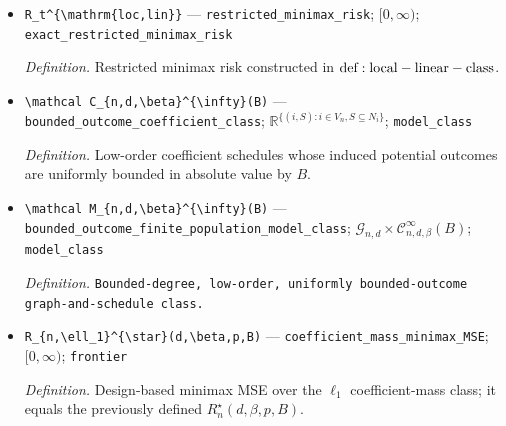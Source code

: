 \documentclass{article}
\begin{document}
\begin{itemize}
  \par\smallskip\noindent\emph{Definition.} Admissible coefficient schedules on the fixed graph \(G_t\).
  \item \texttt{R\_\allowbreak{}t\textasciicircum{}\{\textbackslash{}\allowbreak{}mathrm\{loc,\allowbreak{}lin\}\allowbreak{}\}\allowbreak{}} --- \texttt{restricted\_\allowbreak{}minimax\_\allowbreak{}risk}; \([0,\infty)\); \texttt{exact\_\allowbreak{}restricted\_\allowbreak{}minimax\_\allowbreak{}risk}
  \par\smallskip\noindent\emph{Definition.} Restricted minimax risk constructed in \({\rm def:local-linear-class}\).
  \item \texttt{\textbackslash{}\allowbreak{}mathcal C\_\allowbreak{}\{n,\allowbreak{}d,\allowbreak{}\textbackslash{}\allowbreak{}beta\}\allowbreak{}\textasciicircum{}\{\textbackslash{}\allowbreak{}infty\}\allowbreak{}(B)} --- \texttt{bounded\_\allowbreak{}outcome\_\allowbreak{}coefficient\_\allowbreak{}class}; \(\mathbb R^{\{(i,S):i\in V_n,S\subseteq N_i\}}\); \texttt{model\_\allowbreak{}class}
  \par\smallskip\noindent\emph{Definition.} Low-order coefficient schedules whose induced potential outcomes are uniformly bounded in absolute value by \(B\).
  \item \texttt{\textbackslash{}\allowbreak{}mathcal M\_\allowbreak{}\{n,\allowbreak{}d,\allowbreak{}\textbackslash{}\allowbreak{}beta\}\allowbreak{}\textasciicircum{}\{\textbackslash{}\allowbreak{}infty\}\allowbreak{}(B)} --- \texttt{bounded\_\allowbreak{}outcome\_\allowbreak{}finite\_\allowbreak{}population\_\allowbreak{}model\_\allowbreak{}class}; \(\mathcal G_{n,d}\times\mathcal C_{n,d,\beta}^{\infty}(B)\); \texttt{model\_\allowbreak{}class}
  \par\smallskip\noindent\emph{Definition.} \texttt{Bounded-\allowbreak{}degree,\allowbreak{} low-\allowbreak{}order,\allowbreak{} uniformly bounded-\allowbreak{}outcome graph-\allowbreak{}and-\allowbreak{}schedule class.}
  \item \texttt{R\_\allowbreak{}\{n,\allowbreak{}\textbackslash{}\allowbreak{}ell\_\allowbreak{}1\}\allowbreak{}\textasciicircum{}\{\textbackslash{}\allowbreak{}star\}\allowbreak{}(d,\allowbreak{}\textbackslash{}\allowbreak{}beta,\allowbreak{}p,\allowbreak{}B)} --- \texttt{coefficient\_\allowbreak{}mass\_\allowbreak{}minimax\_\allowbreak{}MSE}; \([0,\infty)\); \texttt{frontier}
  \par\smallskip\noindent\emph{Definition.} Design-based minimax MSE over the \(\ell_1\) coefficient-mass class; it equals the previously defined \(R_n^\star(d,\beta,p,B)\).

\end{itemize}
\end{document}
